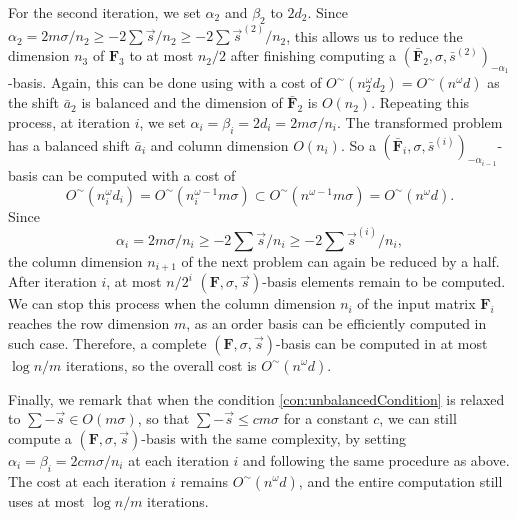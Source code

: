 \begin{pf}
For the second iteration, we set $\alpha_{2}$ and $\beta_{2}$ to
$2d_{2}$. Since $\alpha_{2}=2m\sigma/n_{2}\ge-2\sum\vec{s}/n_{2}\ge-2\sum\vec{s}^{\left(2\right)}/n_{2}$,
this allows us to reduce the dimension $n_{3}$ of $\mathbf{F}_{3}$
to at most $n_{2}/2$ after finishing computing a $\left(\bar{\mathbf{F}}_{2},\sigma,\bar{s}^{\left(2\right)}\right)_{-\alpha_{1}}$-basis.
Again, this can be done using  with a cost of
$O^{\sim}\left(n_{2}^{\omega}d_{2}\right)=O^{\sim}\left(n^{\omega}d\right)$
as the shift $\bar{a}_{2}$ is balanced and the dimension of $\bar{\mathbf{F}}_{2}$
is $O\left(n_{2}\right)$. Repeating this process, at iteration $i$,
we set $\alpha_{i}=\beta_{i}=2d_{i}=2m\sigma/n_{i}$. The transformed
problem has a balanced shift $\bar{a}_{i}$ and column dimension $O\left(n_{i}\right)$.
So a $\left(\bar{\mathbf{F}}_{i},\sigma,\bar{s}^{\left(i\right)}\right)_{-\alpha_{i-1}}$-basis
can be computed with a cost of \[
O^{\sim}\left(n_{i}^{\omega}d_{i}\right)=O^{\sim}\left(n_{i}^{\omega-1}m\sigma\right)\subset O^{\sim}\left(n^{\omega-1}m\sigma\right)=O^{\sim}\left(n^{\omega}d\right).\]
 Since \[
\alpha_{i}=2m\sigma/n_{i}\ge-2\sum\vec{s}/n_{i}\ge-2\sum\vec{s}^{\left(i\right)}/n_{i},\]
 the column dimension $n_{i+1}$ of the next problem can again be
reduced by a half. After iteration $i$, at most $n/2^{i}$ $\left(\mathbf{F},\sigma,\vec{s}\right)$-basis
elements remain to be computed. We can stop this process when the
column dimension $n_{i}$ of the input matrix $\mathbf{F}_{i}$ reaches
the row dimension $m$, as an order basis can be efficiently computed
in such case. Therefore, a complete $\left(\mathbf{F},\sigma,\vec{s}\right)$-basis
can be computed in at most $\log n/m$ iterations, so the overall
cost is $O^{\sim}\left(n^{\omega}d\right)$.
\end{pf}
 Finally, we remark that when the condition
\eqref{con:unbalancedCondition} is relaxed to $\sum-\vec{s}\in O\left(m\sigma\right)$,
so that $\sum-\vec{s}\le cm\sigma$ for a constant $c$, we can still
compute a $\left(\mathbf{F},\sigma,\vec{s}\right)$-basis with the
same complexity, by setting $\alpha_{i}=\beta_{i}=2cm\sigma/n_{i}$
at each iteration $i$ and following the same procedure as above.
The cost at each iteration $i$ remains $O^{\sim}\left(n^{\omega}d\right)$,
and the entire computation still uses at most $\log n/m$ iterations. 

